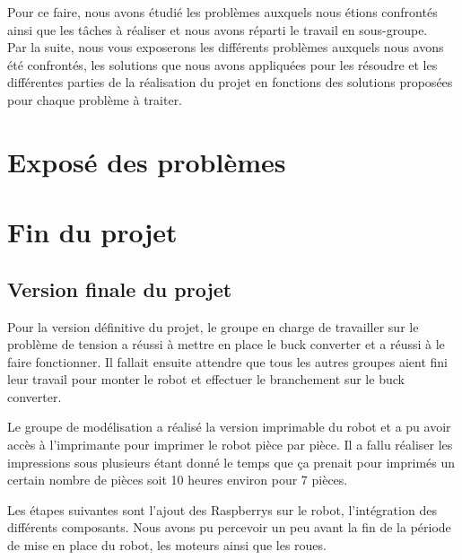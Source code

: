 \documentclass{PackagerQualityN}
\begin{document}
Pour ce faire, nous avons étudié les problèmes auxquels nous étions confrontés ainsi que les tâches à réaliser et nous avons réparti le travail en sous-groupe.\\

Par la suite, nous vous exposerons les différents problèmes auxquels nous avons été confrontés, les solutions que nous avons appliquées pour les résoudre et les différentes parties de la réalisation du projet en fonctions des solutions proposées pour chaque problème à traiter.\\

\newp


\section{Exposé des problèmes}



\newp




\newp
\section{Fin du projet}

\subsection{Version finale du projet}
Pour la version définitive du projet, le groupe en charge de travailler sur le problème de tension a réussi à mettre en place le buck converter et a réussi à le faire fonctionner. Il fallait ensuite attendre que tous les autres groupes aient fini leur travail pour monter le robot et effectuer le branchement sur le buck converter.\\


Le groupe de modélisation a réalisé la version imprimable du robot et a pu avoir accès à l'imprimante pour imprimer le robot pièce par pièce. Il a fallu réaliser les impressions sous plusieurs étant donné le temps que ça prenait pour imprimés un certain nombre de pièces soit 10 heures environ pour 7 pièces.


Les étapes suivantes sont l'ajout des Raspberrys sur le robot, l'intégration des différents composants.
Nous avons pu percevoir un peu avant la fin de la période de mise en place du robot, les moteurs ainsi que les roues.
\end{document}
